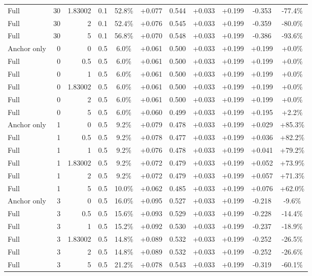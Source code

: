 \begin{table}[htbp]
\begin{tabular}{lrrrccccccc}
Full & 30 & 1.83002 & 0.1 & 52.8\% & +0.077 & 0.544 & +0.033 & +0.199 & -0.353 & -77.4\% \\
Full & 30 & 2 & 0.1 & 52.4\% & +0.076 & 0.545 & +0.033 & +0.199 & -0.359 & -80.0\% \\
Full & 30 & 5 & 0.1 & 56.8\% & +0.070 & 0.548 & +0.033 & +0.199 & -0.386 & -93.6\% \\
Anchor only & 0 & 0 & 0.5 & 6.0\% & +0.061 & 0.500 & +0.033 & +0.199 & +0.199 & +0.0\% \\
Full & 0 & 0.5 & 0.5 & 6.0\% & +0.061 & 0.500 & +0.033 & +0.199 & +0.199 & +0.0\% \\
Full & 0 & 1 & 0.5 & 6.0\% & +0.061 & 0.500 & +0.033 & +0.199 & +0.199 & +0.0\% \\
Full & 0 & 1.83002 & 0.5 & 6.0\% & +0.061 & 0.500 & +0.033 & +0.199 & +0.199 & +0.0\% \\
Full & 0 & 2 & 0.5 & 6.0\% & +0.061 & 0.500 & +0.033 & +0.199 & +0.199 & +0.0\% \\
Full & 0 & 5 & 0.5 & 6.0\% & +0.060 & 0.499 & +0.033 & +0.199 & +0.195 & +2.2\% \\
Anchor only & 1 & 0 & 0.5 & 9.2\% & +0.079 & 0.478 & +0.033 & +0.199 & +0.029 & +85.3\% \\
Full & 1 & 0.5 & 0.5 & 9.2\% & +0.078 & 0.477 & +0.033 & +0.199 & +0.036 & +82.2\% \\
Full & 1 & 1 & 0.5 & 9.2\% & +0.076 & 0.478 & +0.033 & +0.199 & +0.041 & +79.2\% \\
Full & 1 & 1.83002 & 0.5 & 9.2\% & +0.072 & 0.479 & +0.033 & +0.199 & +0.052 & +73.9\% \\
Full & 1 & 2 & 0.5 & 9.2\% & +0.072 & 0.479 & +0.033 & +0.199 & +0.057 & +71.3\% \\
Full & 1 & 5 & 0.5 & 10.0\% & +0.062 & 0.485 & +0.033 & +0.199 & +0.076 & +62.0\% \\
Anchor only & 3 & 0 & 0.5 & 16.0\% & +0.095 & 0.527 & +0.033 & +0.199 & -0.218 & -9.6\% \\
Full & 3 & 0.5 & 0.5 & 15.6\% & +0.093 & 0.529 & +0.033 & +0.199 & -0.228 & -14.4\% \\
Full & 3 & 1 & 0.5 & 15.2\% & +0.092 & 0.530 & +0.033 & +0.199 & -0.237 & -18.9\% \\
Full & 3 & 1.83002 & 0.5 & 14.8\% & +0.089 & 0.532 & +0.033 & +0.199 & -0.252 & -26.5\% \\
Full & 3 & 2 & 0.5 & 14.8\% & +0.089 & 0.532 & +0.033 & +0.199 & -0.252 & -26.6\% \\
Full & 3 & 5 & 0.5 & 21.2\% & +0.078 & 0.543 & +0.033 & +0.199 & -0.319 & -60.1\% \\

\end{tabular}
\end{table}
